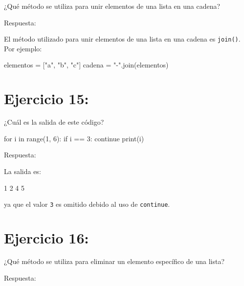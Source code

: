 \documentclass[
  a4paper,
  DIV=11,
  numbers=noendperiod,
  onepage,
  openany]{scrreprt}
\newenvironment{Shaded}{\begin{snugshade}}{\end{snugshade}}
\newcommand{\BuiltInTok}[1]{\textcolor[rgb]{0.00,0.23,0.31}{#1}}
\newcommand{\ControlFlowTok}[1]{\textcolor[rgb]{0.00,0.23,0.31}{#1}}
\newcommand{\DecValTok}[1]{\textcolor[rgb]{0.68,0.00,0.00}{#1}}
\newcommand{\ExtensionTok}[1]{\textcolor[rgb]{0.00,0.23,0.31}{#1}}
\newcommand{\KeywordTok}[1]{\textcolor[rgb]{0.00,0.23,0.31}{#1}}
\newcommand{\NormalTok}[1]{\textcolor[rgb]{0.00,0.23,0.31}{#1}}
\newcommand{\OperatorTok}[1]{\textcolor[rgb]{0.37,0.37,0.37}{#1}}
\newcommand{\StringTok}[1]{\textcolor[rgb]{0.13,0.47,0.30}{#1}}
\begin{document}
¿Qué método se utiliza para unir elementos de una lista en una cadena?

Respuesta:

El método utilizado para unir elementos de una lista en una cadena es
\texttt{join()}. Por ejemplo:

\begin{Shaded}
\begin{Highlighting}[]
\NormalTok{elementos }\OperatorTok{=}\NormalTok{ [}\StringTok{"a"}\NormalTok{, }\StringTok{"b"}\NormalTok{, }\StringTok{"c"}\NormalTok{]}
\NormalTok{cadena }\OperatorTok{=} \StringTok{"{-}"}\NormalTok{.join(elementos)}
\end{Highlighting}
\end{Shaded}

\chapter{Ejercicio 15:}\label{ejercicio-15}

¿Cuál es la salida de este código?

\begin{Shaded}
\begin{Highlighting}[]
\ControlFlowTok{for}\NormalTok{ i }\KeywordTok{in} \BuiltInTok{range}\NormalTok{(}\DecValTok{1}\NormalTok{, }\DecValTok{6}\NormalTok{):}
    \ControlFlowTok{if}\NormalTok{ i }\OperatorTok{==} \DecValTok{3}\NormalTok{:}
        \ControlFlowTok{continue}
    \BuiltInTok{print}\NormalTok{(i)}
\end{Highlighting}
\end{Shaded}

Respuesta:

La salida es:

\begin{Shaded}
\begin{Highlighting}[]
\ExtensionTok{1}
\ExtensionTok{2}
\ExtensionTok{4}
\ExtensionTok{5}
\end{Highlighting}
\end{Shaded}

ya que el valor \texttt{3} es omitido debido al uso de
\texttt{continue}.

\chapter{Ejercicio 16:}\label{ejercicio-16}

¿Qué método se utiliza para eliminar un elemento específico de una
lista?

Respuesta:
\end{document}
